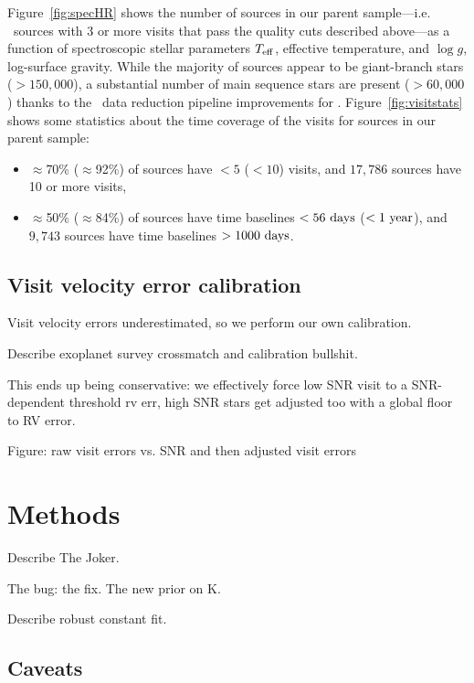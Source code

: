 \documentclass[modern]{aastex62}
\begin{document}
Figure~\ref{fig:specHR} shows the number of sources in our parent sample---i.e.
\apogee\ sources with 3 or more visits that pass the quality cuts described
above---as a function of spectroscopic stellar parameters $T_{\rm eff}$,
effective temperature, and $\log g$, log-surface gravity.
While the majority of sources appear to be giant-branch stars ($>150,000$), a
substantial number of main sequence stars are present ($>60,000$) thanks to the
\apogee\ data reduction pipeline improvements for .
Figure~\ref{fig:visitstats} shows some statistics about the time coverage of the
visits for sources in our parent sample:
\begin{itemize}
    \item $\approx$70\% ($\approx$92\%) of sources have $<5$ ($<10$) visits, and
    $17,786$ sources have 10 or more visits,
    \item $\approx$50\% ($\approx$84\%) of sources have time baselines $<56~{\rm days}$ ($<1~{\rm year}$), and $9,743$ sources have time baselines $>1000~{\rm days}$.
\end{itemize}


\subsection{Visit velocity error calibration} \label{sec:visitcalib}

Visit velocity errors underestimated, so we perform our own calibration.

Describe exoplanet survey crossmatch and calibration bullshit.

This ends up being conservative: we effectively force low SNR visit to a SNR-dependent threshold rv err, high SNR stars get adjusted too with a global floor to RV error.

Figure: raw visit errors vs. SNR and then adjusted visit errors


\section{Methods} \label{sec:methods}

Describe The Joker.

The bug: the fix. The new prior on K.

Describe robust constant fit.

\subsection{Caveats} \label{sec:caveats}
\end{document}
